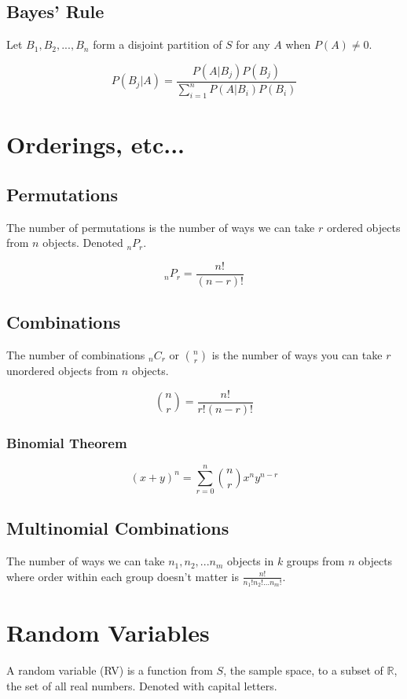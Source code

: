 \documentclass{article}
\begin{document}
\subsection{Bayes' Rule}
Let $B_1, B_2, ..., B_n$ form a disjoint partition of $S$ for any $A$ when
$P(A) \ne 0$.

\begin{equation}
  P(B_j|A) = \frac{P(A|B_j)P(B_j)}{\sum_{i=1}^{n} P(A|B_i)P(B_i)}
\end{equation}

\section{Orderings, etc...}
\subsection{Permutations}
The number of permutations is the number of ways we can take $r$ ordered
objects from $n$ objects. Denoted $_nP_r$.

\begin{equation}
_nP_r = \frac{n!}{(n-r)!}
\end{equation}

\subsection{Combinations}
The number of combinations $_nC_r$ or $n \choose r$ is the number of ways you
can take $r$ unordered objects from $n$ objects.

\begin{equation}
  {n\choose r} = \frac{n!}{r!(n-r)!}
\end{equation}

\subsubsection{Binomial Theorem}
\begin{equation}
(x+y)^n = \sum_{r=0}^{n} {n \choose r}x^n y^{n-r}
\end{equation}

\subsection{Multinomial Combinations}
The number of ways we can take $n_1, n_2, ...  n_m$ objects in $k$ groups from
$n$ objects where order within each group doesn't matter is
$\frac{n!}{n_1!n_2!...n_m!}$.

\section{Random Variables}
A random variable (RV) is a function from $S$, the sample space, to a subset
of $\mathbb{R}$, the set of all real numbers. Denoted with capital letters.
\end{document}
